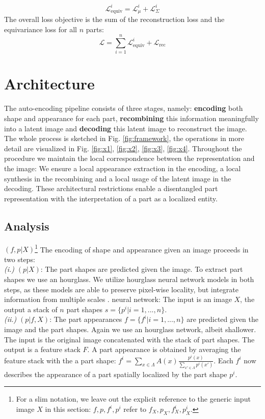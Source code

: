 	\begin{equation}
	\mathcal{L}_{\textrm{equiv}}^i = \mathcal{L}_{\mu}^i+ \mathcal{L}_{\Sigma}^i
	\label{covariance}
	\end{equation}
	The overall loss objective is the sum of the reconstruction loss and the equivariance loss for all $n$ parts:
	\begin{equation}
	\mathcal{L} = \sum_{i=1}^n \mathcal{L}_{\text{equiv}}^i + \mathcal{L}_{\textrm{rec}}
	\end{equation}


\section{Architecture}\label{sec:architecture}
	The auto-encoding pipeline consists of three stages, namely: \textbf{encoding} both shape and appearance for each part,  \textbf{recombining} this information meaningfully into a latent image and \textbf{decoding} this latent image to reconstruct the image. The whole process is sketched in Fig. \ref{fig:framework}, the operations in more detail are visualized in Fig. \ref{fig:x1}, \ref{fig:x2}, \ref{fig:x3},  \ref{fig:x4}. Throughout the procedure we maintain the local correspondence between the representation and the image: We ensure a local appearance extraction in the encoding, a local synthesis in the recombining and a local usage of the latent image in the decoding. These architectural restrictions enable a disentangled part representation with the interpretation of a part as a localized entity. \\

	\subsection{Analysis}
		${(f, p | X)}$\footnote{ For a slim notation, we leave out the explicit reference to the generic input image $X$ in this section: $f, p, f^i, p^i$ refer to $f_X, p_X, f^i_X, p^i_X$.} The encoding of shape and appearance given an image proceeds in two steps: \\
		\emph{(i.)} $(p|X)$: The part shapes are predicted given the image. To extract part shapes we use an hourglass. We utilize hourglass neural network models in both steps, as these models are able to preserve pixel-wise locality, but integrate information from multiple scales \cite{newell16hourglass}.  neural network: The input is an image $X$, the output a stack of $n$ part shapes $s =  \{p^i| i=1, ...,  n\}$.\\ \emph{(ii.)} $(p|f,X)$: The part appearances $f =  \{f^i| i=1, ...,  n\}$ are predicted given the image and the part shapes. Again we use an hourglass network, albeit shallower. The input is the original image concatenated with the stack of part shapes. The output is a feature stack $F$. A part appearance is obtained by averaging the feature stack with the a part shape: $f^i = \sum_{x \in \Lambda} A(x) \frac{p^i(x)}{\sum_{x' \in \Lambda}p^i(x')} $. Each $f^i$ now describes the appearance of a part spatially localized by the part shape $p^i$. \\

